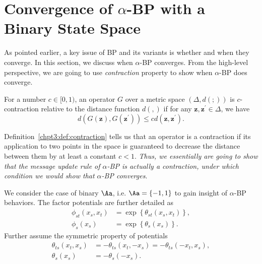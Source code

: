 \section{Convergence of $\alpha$-BP with a Binary State Space}\label{chpt3:sec:cnvg-thm}

As pointed earlier, a key issue of BP and its variants is whether and when they converge. In this section, we discuss when $\alpha$-BP converges. 
From the high-level perspective, we are going to use \textit{contraction} property to show when $\alpha$-BP does converge.
\begin{definition}\label{chpt3:def:contraction}
  For a number $c \in [0,1)$, an operator $G$ over a metric space $(\Delta, d(;))$ is $c$-contraction relative to the distance function $d(,)$ if for any $\bm{z}, \bm{z}^{\prime} \in \Delta$, we have
  \begin{equation}
    d(G(\bm{z}), G(\bm{z}^{\prime})) \leq c d(\bm{z}, \bm{z}^{\prime}).
  \end{equation}
\end{definition}
Definition~\ref{chpt3:def:contraction} tells us that an operator is a contraction if its application to two points in the space is guaranteed to decrease the distance between them by at least a constant $c < 1$. \textit{Thus, we essentially are going to show that the message update rule of $\alpha$-BP is actually a contraction, under which condition we would show that $\alpha$-BP converges}.

We consider the case of binary $\Aa$, i.e. $\Aa=\left\{ -1, 1 \right\}$ to gain insight of $\alpha$-BP behaviors. The factor potentials are further detailed as
\begin{align}
  \phi_{st}(x_s, x_t) &= \exp\left\{ \theta_{st}(x_s, x_t)\right\}, \nonumber \\
  \phi_{s}(x_s) &= \exp\left\{ \theta_{s}(x_s) \right\}.
\end{align}
Further assume the symmetric property of potentials
\begin{align}
  \theta_{ts}(x_t, x_s) &= -\theta_{ts}(x_t, -x_s) = -\theta_{ts}(-x_t, x_s), \nonumber\\
  \theta_{s}(x_s) &= - \theta_s(-x_s).
\end{align}

